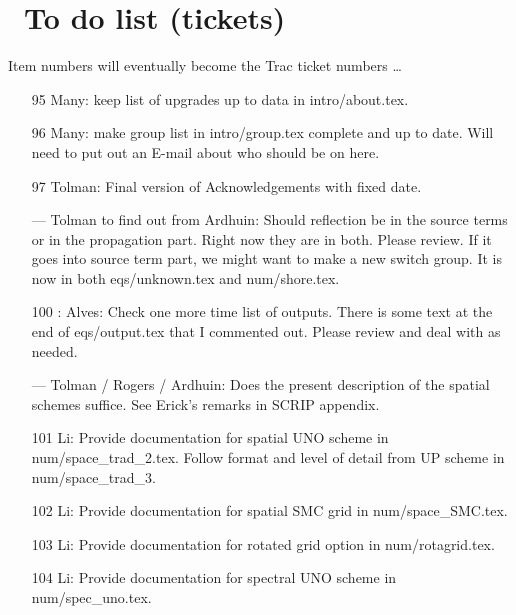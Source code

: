 \pagestyle{myheadings} \setcounter{page}{1} \setcounter{footnote}{0}

\section{~To do list (tickets)} \label{app:to_do}
\newcounters 
\vssub

\noindent
Item numbers will eventually become the Trac ticket numbers \ldots

\begin{itemize}

\item[95] Many: keep list of upgrades up to data in intro/about.tex.

\item[96] Many: make group list in intro/group.tex complete and up to
  date. Will need to put out an E-mail about who should be on here.

\item[97] Tolman: Final version of Acknowledgements with fixed date.

\item[---] Tolman to find out from Ardhuin: Should reflection be in the source
  terms or in the propagation part. Right now they are in both. Please
  review. If it goes into source term part, we might want to make a new switch
  group. It is now in both eqs/unknown.tex and num/shore.tex. 

\item[100]: Alves: Check one more time list of outputs. There is some text at
  the end of eqs/output.tex that I commented out. Please review and deal with
  as needed.

\item[---] Tolman / Rogers / Ardhuin: Does the present description of the
  spatial schemes suffice. See Erick's remarks in SCRIP appendix.

\item[101] Li: Provide documentation for spatial UNO scheme in
  num/space\_trad\_2.tex. Follow format and level of detail from UP scheme in
  num/space\_trad\_3.

\item[102] Li: Provide documentation for spatial SMC grid in num/space\_SMC.tex.

\item[103] Li: Provide documentation for rotated grid option in
  num/rotagrid.tex.

\item[104] Li: Provide documentation for spectral UNO scheme in
  num/spec\_uno.tex.


\end{itemize}
